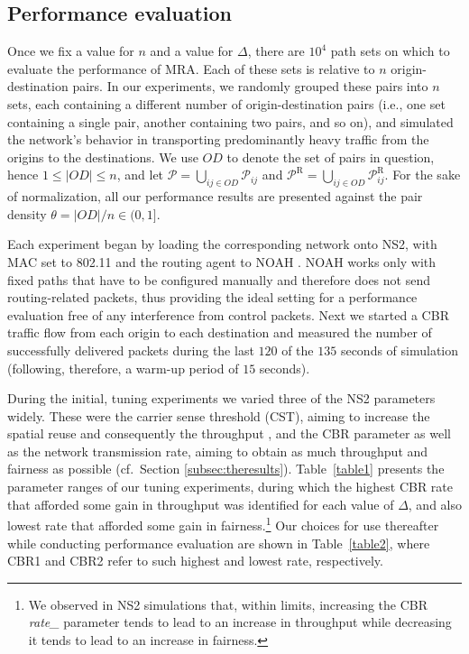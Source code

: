 \documentclass{article}
\begin{document}
\subsection{Performance evaluation}

Once we fix a value for $n$ and a value for $\Delta$, there are $10^4$ path sets
on which to evaluate the performance of MRA. Each of these sets is relative to
$n$ origin-destination pairs. In our experiments, we randomly grouped these
pairs into $n$ sets, each containing a different number of origin-destination
pairs (i.e., one set containing a single pair, another containing two pairs, and
so on), and simulated the network's behavior in transporting predominantly heavy
traffic from the origins to the destinations. We use $OD$ to denote the set of
pairs in question, hence $1\le\vert OD\vert\le n$, and let
$\mathcal{P}=\bigcup_{ij\in OD}\mathcal{P}_{ij}$ and
$\mathcal{P}^\mathrm{R}=\bigcup_{ij\in OD}\mathcal{P}^\mathrm{R}_{ij}$. For the
sake of normalization, all our performance results are presented against the
pair density $\theta=\vert OD\vert/n\in(0,1]$. 

Each experiment began by loading the corresponding network onto NS2, with MAC
set to 802.11 and the routing agent to NOAH \cite{noah}. NOAH works only with
fixed paths that have to be configured manually and therefore does not send
routing-related packets, thus providing the ideal setting for a performance
evaluation free of any interference from control packets. Next we started a CBR
traffic flow from each origin to each destination and measured the number of
successfully delivered packets during the last $120$ of the $135$ seconds of
simulation (following, therefore, a warm-up period of $15$ seconds).

During the initial, tuning experiments we varied three of the NS2 parameters
widely. These were the carrier sense threshold (CST), aiming to increase the
spatial reuse and consequently the throughput \cite{Kim2006}, and the CBR
parameter as well as the network transmission rate, aiming to obtain as much
throughput and fairness as possible (cf.\ Section \ref{subsec:theresults}).
Table~\ref{table1} presents the parameter ranges of our tuning experiments,
during which the highest CBR rate that afforded some gain in throughput was
identified for each value of $\Delta$, and also lowest rate that afforded some
gain in fairness.\footnote{We observed in NS2 simulations that, within limits,
increasing the CBR \emph{rate\_} parameter tends to lead to an increase in
throughput while decreasing it tends to lead to an increase in fairness.} Our
choices for use thereafter while conducting performance evaluation are shown in
Table~\ref{table2}, where CBR1 and CBR2 refer to such highest and lowest rate,
respectively.
\end{document}
